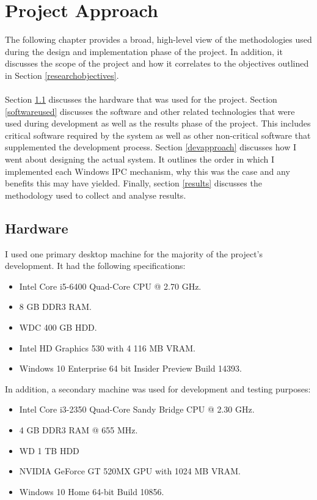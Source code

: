 \documentclass[12pt] {newrucsthesis}    %
\begin{document}
  \chapter{Project Approach}
    The following chapter provides a broad, high-level view of the methodologies used during the
    design and implementation phase of the project. In addition, it discusses the scope of the project
    and how it correlates to the objectives outlined in Section \ref{researchobjectives}.
    \\\\
    Section \ref{hardwareused} discusses the hardware that was used for the project.
    Section \ref{softwareused} discusses the software and other related technologies that were used
    during development as well as the results phase of the project. This includes critical software
    required by the system as well as other non-critical software that supplemented the development process.
    Section \ref{devapproach} discusses how I went about designing the actual system. It outlines the
    order in which I implemented each Windows IPC mechanism, why this was the case and any benefits this
    may have yielded. Finally, section \ref{results} discusses the methodology used to collect and analyse results.

    \section{Hardware} \label{hardwareused} %
      I used one primary desktop machine for the majority of the project's development. It had the following specifications:
        \begin{itemize}
          \item Intel Core i5-6400 Quad-Core CPU @ 2.70 GHz.
          \item 8 GB DDR3 RAM.
          \item WDC 400 GB HDD.
          \item Intel HD Graphics 530 with 4 116 MB VRAM.
          \item Windows 10 Enterprise 64 bit Insider Preview Build 14393.
        \end{itemize}
      In addition, a secondary machine was used for development and testing purposes:
        \begin{itemize}
          \item	Intel Core i3-2350 Quad-Core Sandy Bridge CPU @ 2.30 GHz.
        	\item	4 GB DDR3 RAM @ 655 MHz.
          \item WD 1 TB HDD
        	\item NVIDIA GeForce GT 520MX GPU with 1024 MB VRAM.
          \item Windows 10 Home 64-bit Build 10856.
        \end{itemize}
\end{document}
